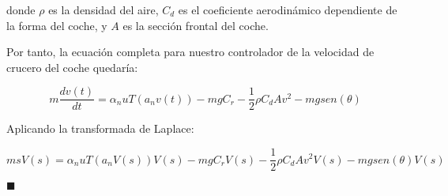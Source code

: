 \documentclass[12pt]{article}
\begin{document}
donde $\rho$ es la densidad del aire, $C_d$ es el coeficiente aerodinámico dependiente de la forma
del coche, y $A$ es la sección frontal del coche.

Por tanto, la ecuación completa para nuestro controlador de la velocidad de crucero del coche
quedaría:

\begin{equation}
  m \dfrac{dv(t)}{dt} = \alpha_n u T(a_n v(t)) - m g C_r - \dfrac{1}{2} \rho C_d A v^2 - m g sen(\theta)
\end{equation}

Aplicando la transformada de Laplace:

\begin{equation}
  m s V(s) = \alpha_n u T(a_n V(s)) V(s) - m g C_r V(s) - \dfrac{1}{2} \rho C_d A v^2 V(s) - m g sen(\theta) V(s)
\end{equation}

\hfill

\begin{flushright}
  $\blacksquare$
\end{flushright}
\end{document}
